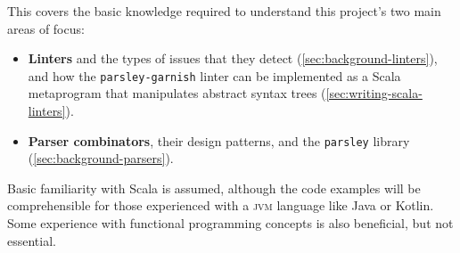 \documentclass[../../main.tex]{subfiles}
\begin{document}
\label{sec:background}
This  covers the basic knowledge required to understand this project's two main areas of focus:
\begin{itemize}
  \item \textbf{Linters} and the types of issues that they detect (\cref{sec:background-linters}), and how the \texttt{parsley-garnish} linter can be implemented as a Scala metaprogram that manipulates abstract syntax trees (\cref{sec:writing-scala-linters}).
  \item \textbf{Parser combinators}, their design patterns, and the \texttt{parsley} library (\cref{sec:background-parsers}).
\end{itemize}
%
Basic familiarity with Scala is assumed, although the code examples will be comprehensible for those experienced with a \textsc{jvm} language like Java or Kotlin.
Some experience with functional programming concepts is also beneficial, but not essential.

%
%
\end{document}
